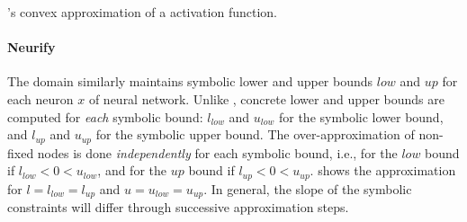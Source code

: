 \begin{marginfigure}
  \caption{\neurify's convex approximation of a \relu{} activation function.}
\end{marginfigure}

\paragraph{Neurify}

The \neurify{} domain  similarly maintains symbolic lower and upper bounds $low$ and $up$ for each neuron $x$ of neural network. Unlike \deeppoly, concrete lower and upper bounds are computed for \emph{each} symbolic bound: $l_{low}$ and $u_{low}$ for the symbolic lower bound, and $l_{up}$ and $u_{up}$ for the symbolic upper bound.
%
The over-approximation of non-fixed \relu{} nodes is done \emph{independently} for each symbolic bound, i.e., for the $low$ bound if $l_{low} < 0 < u_{low}$, and for the $up$ bound if $l_{up} < 0 < u_{up}$.
%
 shows the approximation for $l = l_{low} = l_{up}$ and $u = u_{low} = u_{up}$. In general, the slope of the symbolic constraints will differ through successive approximation steps.

